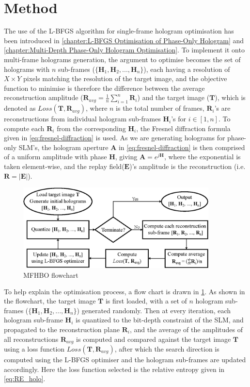\section{Method}
	The use of the L-BFGS algorithm for single-frame hologram optimisation has been introduced in \cref{chapter:L-BFGS Optimisation of Phase-Only Hologram} and \cref{chapter:Multi-Depth Phase-Only Hologram Optimisation}. To implement it onto multi-frame holograms generation, the argument to optimise becomes the set of holograms with $n$ sub-frames ($\{\textbf{H}_1, \textbf{H}_2, ..., \textbf{H}_n\}$), each having a resolution of $X\times Y$ pixels matching the resolution of the target image, and the objective function to minimise is therefore the difference between the average reconstruction amplitude ($\textbf{R}_{avg}=\frac{1}{n}\sum_{i=1}^n\textbf{R}_i$) and the target image ($\textbf{T}$), which is denoted as $Loss(\textbf{T}, \textbf{R}_{avg})$, where $n$ is the total number of frames, $\textbf{R}_i$'s are reconstructions from individual hologram sub-frames $\textbf{H}_i$'s for $i\in[1,n]$. To compute each $\textbf{R}_i$ from the corresponding $\textbf{H}_i$, the Fresnel diffraction formula given in \cref{eq:fresnel-diffraction} is used. As we are generating holograms for phase-only SLM's, the hologram aperture $\textbf{A}$ in \cref{eq:fresnel-diffraction} is then comprised of a uniform amplitude with phase $\textbf{H}$, giving $\textbf{A} = e^{j\textbf{H}}$, where the exponential is taken element-wise, and the replay field($\textbf{E}$)'s amplitude is the reconstruction (i.e.$\textbf{R} = |\textbf{E}|$).

	\begin{figure}[H]
		\centering
		\includegraphics[width=0.9\textwidth]{MFHO_flowchart.eps}
		\caption{MFHBO flowchart}
		\label{fig:MFHO_flowchart}
	\end{figure}

	To help explain the optimisation process, a flow chart is drawn in \cref{fig:MFHO_flowchart}. As shown in the flowchart, the target image $\textbf{T}$ is first loaded, with a set of $n$ hologram sub-frames ($\{\textbf{H}_1, \textbf{H}_2, ..., \textbf{H}_n\}$) generated randomly. Then at every iteration, each hologram sub-frame $\textbf{H}_i$ is quantized to the bit-depth constraint of the SLM, and propagated to the reconstruction plane $\textbf{R}_i$, and the average of the amplitudes of all reconstructions $\textbf{R}_{avg}$ is computed and compared against the target image $\textbf{T}$ using a loss function $Loss(\textbf{T}, \textbf{R}_{avg})$, after which the search direction is computed using the L-BFGS optimiser and the hologram sub-frames are updated accordingly. Here the loss function selected is the relative entropy\cite{Kullback1951} given in \cref{eq:RE_holo}.

